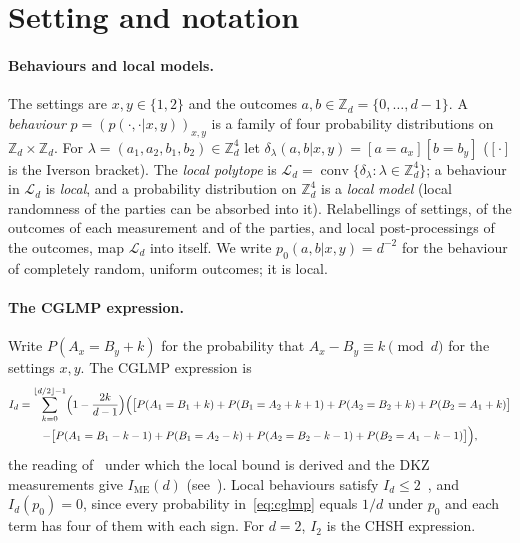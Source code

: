 \documentclass[11pt]{article}
\theoremstyle{remark}
\numberwithin{equation}{section}
\newcommand{\Z}{\mathbb{Z}}
\newcommand{\IME}{I_{\mathrm{ME}}}
\newcommand{\cL}{\mathcal{L}}
\begin{document}
\section{Setting and notation}\label{sec:setting}

\paragraph{Behaviours and local models.}
The settings are $x,y\in\{1,2\}$ and the outcomes $a,b\in\Z_d=\{0,\dots,d-1\}$. A \emph{behaviour}
$p=(p(\cdot,\cdot|x,y))_{x,y}$ is a family of four probability distributions on $\Z_d\times\Z_d$. For
$\lambda=(a_1,a_2,b_1,b_2)\in\Z_d^4$ let $\delta_\lambda(a,b|x,y)=[a=a_x][b=b_y]$ ($[\cdot]$ is the Iverson bracket).
The \emph{local polytope} is $\cL_d=\operatorname{conv}\{\delta_\lambda:\lambda\in\Z_d^4\}$; a behaviour in $\cL_d$ is
\emph{local}, and a probability distribution on $\Z_d^4$ is a \emph{local model} (local randomness of the parties can
be absorbed into it). Relabellings of settings, of the outcomes of each measurement and of the parties, and local
post-processings of the outcomes, map $\cL_d$ into itself. We write $p_0(a,b|x,y)=d^{-2}$ for the behaviour of
completely random, uniform outcomes; it is local.

\paragraph{The CGLMP expression.}
Write $P(A_x=B_y+k)$ for the probability that $A_x-B_y\equiv k\pmod d$ for the settings $x,y$. The CGLMP expression is
\begin{multline}\label{eq:cglmp}
I_d=\sum_{k=0}^{\lfloor d/2\rfloor-1}\Bigl(1-\frac{2k}{d-1}\Bigr)\Bigl(\bigl[P(A_1=B_1+k)+P(B_1=A_2+k+1)
+P(A_2=B_2+k)+P(B_2=A_1+k)\bigr]\\
-\bigl[P(A_1=B_1-k-1)+P(B_1=A_2-k)+P(A_2=B_2-k-1)+P(B_2=A_1-k-1)\bigr]\Bigr),
\end{multline}
the reading of~\cite{CGLMP} under which the local bound is derived and the DKZ measurements give $\IME(d)$
(see~\cite[Section~2]{MSclassical}). Local behaviours satisfy $I_d\le2$~\cite{CGLMP}, and $I_d(p_0)=0$, since every
probability in~\eqref{eq:cglmp} equals $1/d$ under $p_0$ and each term has four of them with each sign. For $d=2$,
$I_2$ is the CHSH expression.
\end{document}
